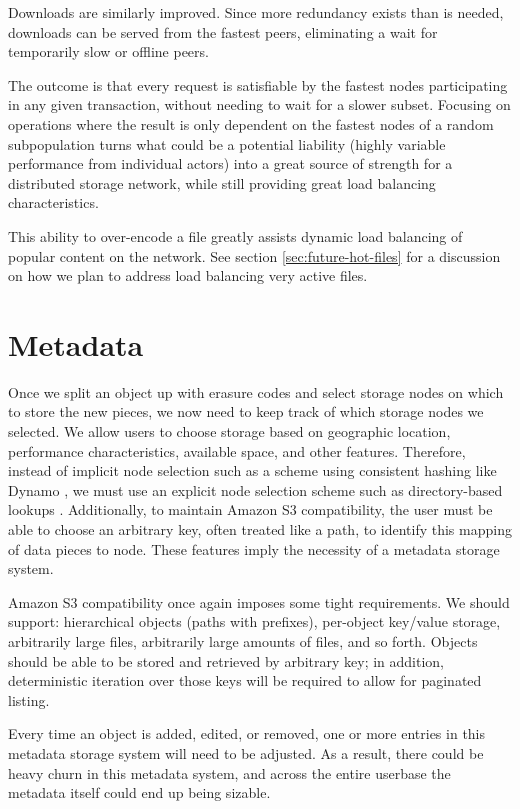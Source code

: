 \documentclass[8pt,fleqn,openany]{book}
\begin{document}
Downloads are similarly improved. Since more redundancy exists than is needed,
downloads can be served from the fastest peers, eliminating a wait for temporarily slow or offline peers.

The outcome is that every request is satisfiable by the fastest nodes
participating in any given transaction, without needing to wait for a slower
subset.
Focusing on operations where the result is only dependent on the fastest
nodes of a random subpopulation turns what could be a potential liability
(highly variable performance from individual actors) into a great source of
strength for a distributed storage network, while still providing great load
balancing characteristics.

This ability to over-encode a file greatly assists dynamic load balancing of
popular content on the network. See section \ref{sec:future-hot-files} for
a discussion on how we plan to address load balancing very active files.

\section{Metadata}\label{sec:framework-metadata}

Once we split an object up with erasure codes and select storage nodes on
which to store the new pieces, we now need to keep track of which storage
nodes we selected. We allow users to choose storage based on geographic
location, performance characteristics, available space, and other features.
Therefore, instead of implicit node selection such as a scheme using consistent
hashing like Dynamo \cite{dynamo}, we must use an explicit node selection
scheme such as directory-based lookups \cite{p2p-policies}.
Additionally, to maintain Amazon S3 compatibility, the user must be able to
choose an arbitrary key, often treated like a path, to identify this mapping
of data pieces to node. These features imply the necessity of a metadata
storage system.

Amazon S3 compatibility once again imposes some tight requirements.
We should support:
hierarchical objects (paths with prefixes), per-object key/value storage,
arbitrarily large files, arbitrarily large amounts of files, and so forth.
Objects should be able to be stored and retrieved by arbitrary key; in addition,
deterministic iteration over those keys will be required to allow for
paginated listing.

Every time an
object is added, edited, or removed, one or more entries in this metadata
storage system will need to be adjusted. As a result, there could be heavy churn
in this metadata system, and across the entire userbase the metadata itself
could end up being sizable.
\end{document}
